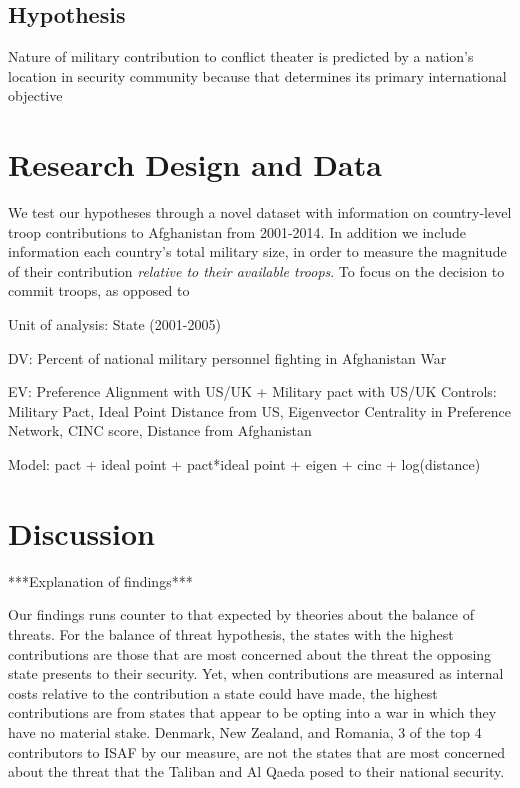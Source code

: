 \documentclass[12pt,letterpaper]{article}
\begin{document}
	\subsection{Hypothesis}
		Nature of military contribution to conflict theater is predicted by a nation's location in security community because that determines its primary international objective

\section{Research Design and Data}
	We test our hypotheses through a novel dataset with information on country-level troop contributions to Afghanistan from 2001-2014. In addition we include information each country's total military size, in order to measure the magnitude of their contribution \textit{relative to their available troops}. To focus on the decision to commit troops, as opposed to

	Unit of analysis: State (2001-2005)

	DV: Percent of national military personnel fighting in Afghanistan War

	EV: Preference Alignment with US/UK + Military pact with US/UK
	Controls: Military Pact, Ideal Point Distance from US,  Eigenvector Centrality in Preference Network, CINC score, Distance from Afghanistan

	Model: pact + ideal point + pact*ideal point + eigen + cinc + log(distance)

\section{Discussion}

	***Explanation of findings***

	Our findings runs counter to that expected by theories about the balance of threats. For the balance of threat hypothesis, the states with the highest contributions are those that are most concerned about the threat the opposing state presents to their security. Yet, when contributions are measured as internal costs relative to the contribution a state could have made, the highest contributions are from states that appear to be opting into a war in which they have no material stake. Denmark, New Zealand, and Romania, 3 of the top 4 contributors to ISAF by our measure, are not the states that are most concerned about the threat that the Taliban and Al Qaeda posed to their national security.
\end{document}
